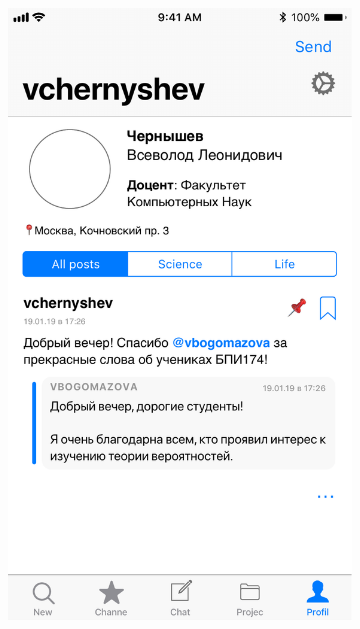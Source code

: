 \documentclass[a4paper,12pt,reqno]{article}
\begin{document}
\begin{figure}[h!]
\begin{subfigure}[b]{0.3\linewidth}
			\includegraphics[width=\linewidth]{../includes/prototype/5.pdf}
		\end{subfigure}
		\begin{subfigure}[b]{0.3\linewidth}

\end{subfigure}
\end{figure}
\end{document}
